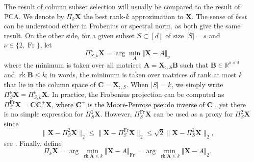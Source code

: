\documentclass[twoside,11pt]{book}
\newcommand{\rev}[1]{\textcolor{black}{#1}}
\numberwithin{theorem}{chapter}
\numberwithin{definition}{chapter}
\numberwithin{proposition}{chapter}
\numberwithin{corollary}{chapter}
\numberwithin{example}{chapter}
\numberwithin{lemma}{chapter}
\numberwithin{assumption}{chapter}
\numberwithin{equation}{chapter}
\numberwithin{figure}{chapter}
\DeclareMathOperator{\rank}{\mathrm{rk}}
\DeclareMathOperator{\Fr}{\mathrm{Fr}}
\begin{document}
The result of column subset selection will usually be compared to the result of PCA. We denote by $\Pi_k\bm{X}$ the best rank-$k$ approximation to $\bm{X}$. The sense of \emph{best} can be understood either in Frobenius or spectral norm, as both give the same result. On the other side, for a given subset $S \subset [d]$ of size $\vert S\vert=s$ and $\nu\in\{2,\Fr\}$, let
$$\Pi_{S,k}^{\nu}\bm{X} = \arg\min_{A} \Vert \bm{X}- A\Vert_{\nu}$$
where the minimum is taken over all matrices $\bm{A} = \bm{X}_{:,S}\bm{B}$ such that $\bm{B}\in\mathbb{R}^{s\times d}$ and $\rank \bm{B}\leq k$; in words, the minimum is taken over matrices of rank at most $k$ that lie in the column space of $\bm{C}=\bm{X}_{:,S}$. When $|S| = k$, we simply write $\Pi_{S}^{\nu}\bm{X} = \Pi_{S,k}^{\nu}\bm{X}$. In practice, the Frobenius projection can be computed as $\Pi_{S}^{\Fr}\bm{X} = \bm{C}\bm{C}^{+}\bm{X}$, \rev{where $\bm{C}^{+}$ is the Moore-Penrose pseudo inverse of $\bm{C}$} , yet there is no simple expression for $\Pi_{S}^{2}\bm{X}$. However, $\Pi_{S}^{\Fr}\bm{X}$ can be used as a proxy for $\Pi_{S}^{2}\bm{X}$ since
\begin{equation}\label{eq:frob_as_estimator_of_spe}
\|\bm{X} - \Pi_{S}^{2}\bm{X}\|_{2} \leq \|\bm{X} - \Pi_{S}^{\Fr}\bm{X}\|_{2}  \leq \sqrt{2} \|\bm{X} - \Pi_{S}^{2}\bm{X}\|_{2},
\end{equation}
see \cite[Lemma 2.3]{BoDrMI11}.
Finally, define
$$\Pi_{k}\bm{X} = \arg\min_{\rank \bm{A}\leq k} \Vert \bm{X}- A\Vert_{\Fr} = \arg\min_{\rank \bm{A}\leq k} \Vert \bm{X}- A\Vert_{2}.$$
\end{document}
